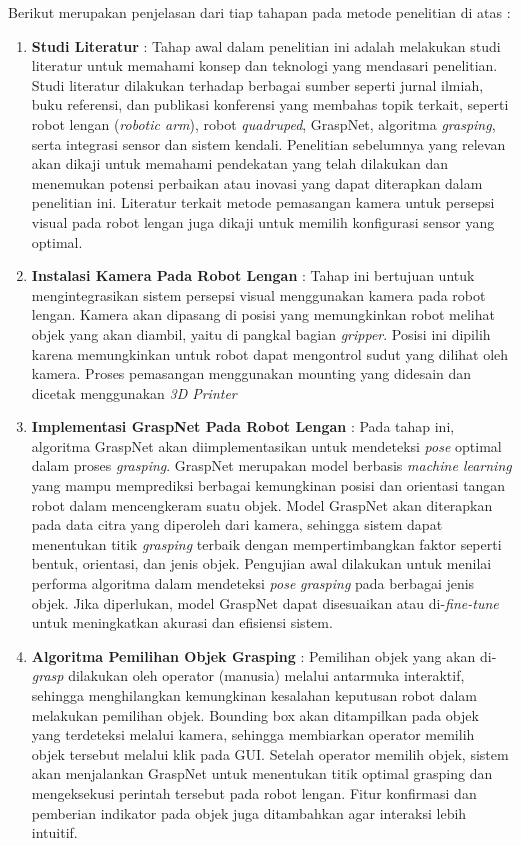 Berikut merupakan penjelasan dari tiap tahapan pada metode penelitian di atas :
\begin{enumerate}
  \item \textbf{Studi Literatur} : Tahap awal dalam penelitian ini adalah melakukan studi literatur untuk memahami konsep
  dan teknologi yang mendasari penelitian. Studi literatur dilakukan terhadap berbagai sumber
  seperti jurnal ilmiah, buku referensi, dan publikasi konferensi yang membahas topik terkait,
  seperti robot lengan (\emph{robotic arm}), robot \emph{quadruped}, GraspNet, algoritma \emph{grasping}, serta
  integrasi sensor dan sistem kendali. Penelitian sebelumnya yang relevan akan dikaji untuk
  memahami pendekatan yang telah dilakukan dan menemukan potensi perbaikan atau inovasi
  yang dapat diterapkan dalam penelitian ini. Literatur terkait metode pemasangan kamera
  untuk persepsi visual pada robot lengan juga dikaji untuk memilih konfigurasi sensor yang optimal.

  \item \textbf{Instalasi Kamera Pada Robot Lengan} : Tahap ini bertujuan untuk mengintegrasikan
  sistem persepsi visual menggunakan kamera pada robot lengan. Kamera akan dipasang di posisi
  yang memungkinkan robot melihat objek yang akan diambil, yaitu di pangkal bagian \emph{gripper}.
  Posisi ini dipilih karena memungkinkan untuk robot dapat mengontrol sudut yang dilihat oleh kamera.
  Proses pemasangan menggunakan mounting yang didesain dan dicetak menggunakan \emph{3D Printer}

  \item \textbf{Implementasi GraspNet Pada Robot Lengan} : Pada tahap ini, algoritma GraspNet
  akan diimplementasikan untuk mendeteksi \emph{pose} optimal dalam proses \emph{grasping}.
  GraspNet merupakan model berbasis \emph{machine learning} yang mampu memprediksi berbagai
  kemungkinan posisi dan orientasi tangan robot dalam mencengkeram suatu objek. Model GraspNet
  akan diterapkan pada data citra yang diperoleh dari kamera, sehingga sistem dapat menentukan
  titik \emph{grasping} terbaik dengan mempertimbangkan faktor seperti bentuk, orientasi, dan jenis objek.
  Pengujian awal dilakukan untuk menilai performa algoritma dalam mendeteksi \emph{pose} \emph{grasping}
  pada berbagai jenis objek. Jika diperlukan, model GraspNet dapat disesuaikan atau
  di-\emph{fine-tune} untuk meningkatkan akurasi dan efisiensi sistem.

  \item \textbf{Algoritma Pemilihan Objek Grasping} : Pemilihan objek yang akan di-\emph{grasp} dilakukan
  oleh operator (manusia) melalui antarmuka interaktif, sehingga menghilangkan kemungkinan kesalahan
  keputusan robot dalam melakukan pemilihan objek. Bounding box akan ditampilkan pada objek yang terdeteksi
  melalui kamera, sehingga membiarkan operator memilih objek tersebut melalui klik pada GUI. Setelah operator
  memilih objek, sistem akan menjalankan GraspNet untuk menentukan titik optimal grasping dan
  mengeksekusi perintah tersebut pada robot lengan. Fitur konfirmasi dan pemberian indikator pada objek
  juga ditambahkan agar interaksi lebih intuitif.


\end{enumerate}
